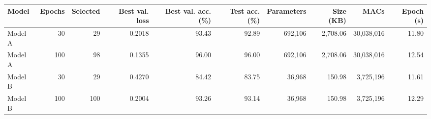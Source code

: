 \begin{tabular}{lrrrrrrrrr}
\hline
Model & Epochs & Selected & Best val. loss & Best val. acc. (\%) & Test acc. (\%) & Parameters & Size (KB) & MACs & Epoch (s) \\
\hline
Model A & 30 & 29 & 0.2018 & 93.43 & 92.89 & 692{,}106 & 2{,}708.06 & 30{,}038{,}016 & 11.80 \\
Model A & 100 & 98 & 0.1355 & 96.00 & 96.00 & 692{,}106 & 2{,}708.06 & 30{,}038{,}016 & 12.54 \\
Model B & 30 & 29 & 0.4270 & 84.42 & 83.75 & 36{,}968 & 150.98 & 3{,}725{,}196 & 11.61 \\
Model B & 100 & 100 & 0.2004 & 93.26 & 93.14 & 36{,}968 & 150.98 & 3{,}725{,}196 & 12.29 \\
\hline
\end{tabular}
